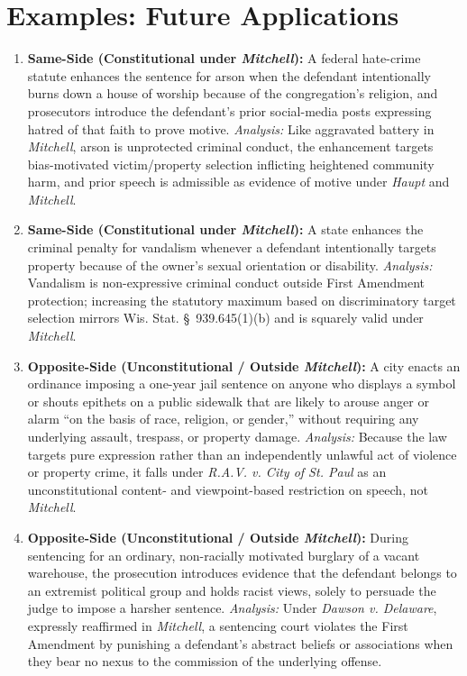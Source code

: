 \documentclass[12pt]{article}
\begin{document}
\section{Examples: Future Applications}
\begin{enumerate}
    \item \textbf{Same-Side (Constitutional under \textit{Mitchell}):} A federal hate-crime statute enhances the sentence for arson when the defendant intentionally burns down a house of worship because of the congregation's religion, and prosecutors introduce the defendant's prior social-media posts expressing hatred of that faith to prove motive. \textit{Analysis:} Like aggravated battery in \textit{Mitchell}, arson is unprotected criminal conduct, the enhancement targets bias-motivated victim/property selection inflicting heightened community harm, and prior speech is admissible as evidence of motive under \textit{Haupt} and \textit{Mitchell}.
    \item \textbf{Same-Side (Constitutional under \textit{Mitchell}):} A state enhances the criminal penalty for vandalism whenever a defendant intentionally targets property because of the owner's sexual orientation or disability. \textit{Analysis:} Vandalism is non-expressive criminal conduct outside First Amendment protection; increasing the statutory maximum based on discriminatory target selection mirrors Wis. Stat. \S~939.645(1)(b) and is squarely valid under \textit{Mitchell}.
    \item \textbf{Opposite-Side (Unconstitutional / Outside \textit{Mitchell}):} A city enacts an ordinance imposing a one-year jail sentence on anyone who displays a symbol or shouts epithets on a public sidewalk that are likely to arouse anger or alarm ``on the basis of race, religion, or gender,'' without requiring any underlying assault, trespass, or property damage. \textit{Analysis:} Because the law targets pure expression rather than an independently unlawful act of violence or property crime, it falls under \textit{R.A.V. v. City of St. Paul} as an unconstitutional content- and viewpoint-based restriction on speech, not \textit{Mitchell}.
    \item \textbf{Opposite-Side (Unconstitutional / Outside \textit{Mitchell}):} During sentencing for an ordinary, non-racially motivated burglary of a vacant warehouse, the prosecution introduces evidence that the defendant belongs to an extremist political group and holds racist views, solely to persuade the judge to impose a harsher sentence. \textit{Analysis:} Under \textit{Dawson v. Delaware}, expressly reaffirmed in \textit{Mitchell}, a sentencing court violates the First Amendment by punishing a defendant's abstract beliefs or associations when they bear no nexus to the commission of the underlying offense.

\end{enumerate}
\end{document}
